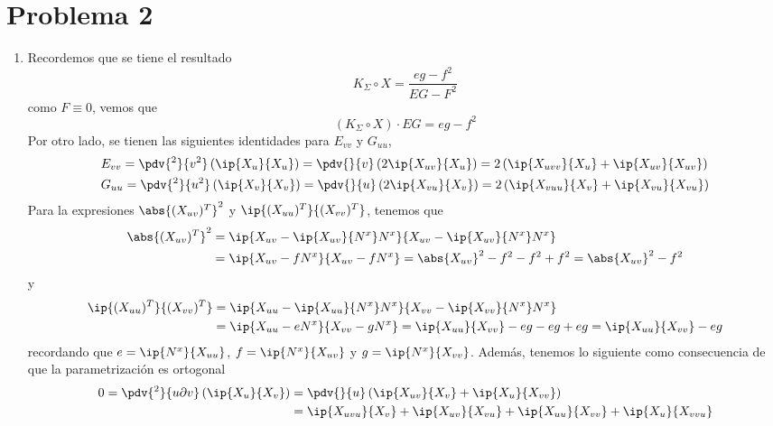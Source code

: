 \documentclass{article}
\begin{document}
\section*{Problema 2}
\begin{enumerate}
    \item Recordemos que se tiene el resultado
    \begin{equation*}
        K_{\Sigma}\circ X=\frac{eg-f^{2}}{EG-F^{2}}
    \end{equation*}
    como $F\equiv0$, vemos que
    \begin{equation*}
        (K_{\Sigma}\circ X)\cdot EG=eg-f^{2}
    \end{equation*}
    Por otro lado, se tienen las siguientes identidades para $E_{vv}$ y $G_{uu}$,
    \begin{align*}
        & E_{vv}=\pdv{^{2}}{v^{2}}\left(\ip{X_{u}}{X_{u}}\right)
        =\pdv{}{v}\left(2\ip{X_{uv}}{X_{u}}\right)
        =2\left(\ip{X_{uvv}}{X_{u}}+\ip{X_{uv}}{X_{uv}}\right) \\
        & G_{uu}=\pdv{^{2}}{u^{2}}\left(\ip{X_{v}}{X_{v}}\right)
        =\pdv{}{u}\left(2\ip{X_{vu}}{X_{v}}\right)
        =2\left(\ip{X_{vuu}}{X_{v}}+\ip{X_{vu}}{X_{vu}}\right)
    \end{align*}
    Para la expresiones $\abs{(X_{uv})^{T}}^{2}$ y $\ip{(X_{uu})^{T}}{(X_{vv})^{T}}$, tenemos que
    \begin{align*}
        \abs{(X_{uv})^{T}}^{2} &= \ip{X_{uv}-\ip{X_{uv}}{N^{x}}N^{x}}
        {X_{uv}-\ip{X_{uv}}{N^{x}}N^{x}} \\
        &= \ip{X_{uv}-fN^{x}}{X_{uv}-fN^{x}}=\abs{X_{uv}}^{2}-f^{2}-f^{2}+f^{2}
        =\abs{X_{uv}}^{2}-f^{2}
    \end{align*}
    y
    \begin{align*}
        \ip{(X_{uu})^{T}}{(X_{vv})^{T}} &= \ip{X_{uu}-\ip{X_{uu}}{N^{x}}N^{x}}{X_{vv}-\ip{X_{vv}}
        {N^{x}}N^{x}} \\
        &= \ip{X_{uu}-eN^{x}}{X_{vv}-gN^{x}}=\ip{X_{uu}}{X_{vv}}-eg-eg+eg=\ip{X_{uu}}{X_{vv}}-eg
    \end{align*}
    recordando que $e=\ip{N^{x}}{X_{uu}}$, $f=\ip{N^{x}}{X_{uv}}$ y $g=\ip{N^{x}}{X_{vv}}$. 
    Además, tenemos lo siguiente como consecuencia de que la parametrización es ortogonal
    \begin{align*}
        0=\pdv{^{2}}{u\partial v}\left(\ip{X_{u}}{X_{v}}\right)
        &= \pdv{}{u}\left(\ip{X_{uv}}{X_{v}}+\ip{X_{u}}{X_{vv}}\right) \\
        &= \ip{X_{uvu}}{X_{v}}+\ip{X_{uv}}{X_{vu}}+\ip{X_{uu}}{X_{vv}}+\ip{X_{u}}{X_{vvu}}

\end{align*}
\end{enumerate}
\end{document}
